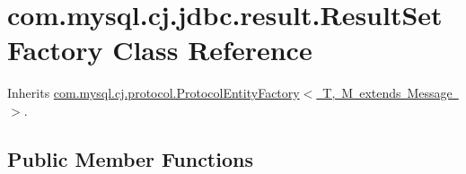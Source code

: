 \hypertarget{classcom_1_1mysql_1_1cj_1_1jdbc_1_1result_1_1_result_set_factory}{}\section{com.\+mysql.\+cj.\+jdbc.\+result.\+Result\+Set\+Factory Class Reference}
\label{classcom_1_1mysql_1_1cj_1_1jdbc_1_1result_1_1_result_set_factory}


Inherits \mbox{\hyperlink{interfacecom_1_1mysql_1_1cj_1_1protocol_1_1_protocol_entity_factory}{com.\+mysql.\+cj.\+protocol.\+Protocol\+Entity\+Factory$<$ T, M extends Message $>$}}.

\subsection*{Public Member Functions}
